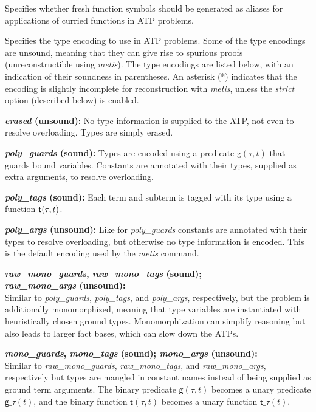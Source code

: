 \documentclass[a4paper,12pt]{article}
\newcommand\const[1]{\textsf{#1}}
\begin{document}
\begin{enum}
Specifies whether fresh function symbols should be generated as aliases for
applications of curried functions in ATP problems.

Specifies the type encoding to use in ATP problems. Some of the type encodings
are unsound, meaning that they can give rise to spurious proofs
(unreconstructible using \textit{metis}). The type encodings are
listed below, with an indication of their soundness in parentheses.
An asterisk (*) indicates that the encoding is slightly incomplete for
reconstruction with \textit{metis}, unless the \emph{strict} option (described
below) is enabled.

\begin{enum}
\item[\labelitemi] \textbf{\textit{erased} (unsound):} No type information is
supplied to the ATP, not even to resolve overloading. Types are simply erased.

\item[\labelitemi] \textbf{\textit{poly\_guards} (sound):} Types are encoded using
a predicate \const{g}$(\tau, t)$ that guards bound
variables. Constants are annotated with their types, supplied as extra
arguments, to resolve overloading.

\item[\labelitemi] \textbf{\textit{poly\_tags} (sound):} Each term and subterm is
tagged with its type using a function $\const{t\/}(\tau, t)$.

\item[\labelitemi] \textbf{\textit{poly\_args} (unsound):}
Like for \textit{poly\_guards} constants are annotated with their types to
resolve overloading, but otherwise no type information is encoded. This
is the default encoding used by the \textit{metis} command.

\item[\labelitemi]
\textbf{%
\textit{raw\_mono\_guards}, \textit{raw\_mono\_tags} (sound); \\
\textit{raw\_mono\_args} (unsound):} \\
Similar to \textit{poly\_guards}, \textit{poly\_tags}, and \textit{poly\_args},
respectively, but the problem is additionally monomorphized, meaning that type
variables are instantiated with heuristically chosen ground types.
Monomorphization can simplify reasoning but also leads to larger fact bases,
which can slow down the ATPs.

\item[\labelitemi]
\textbf{%
\textit{mono\_guards}, \textit{mono\_tags} (sound);
\textit{mono\_args} (unsound):} \\
Similar to
\textit{raw\_mono\_guards}, \textit{raw\_mono\_tags}, and
\textit{raw\_mono\_args}, respectively but types are mangled in constant names
instead of being supplied as ground term arguments. The binary predicate
$\const{g}(\tau, t)$ becomes a unary predicate
$\const{g\_}\tau(t)$, and the binary function
$\const{t}(\tau, t)$ becomes a unary function
$\const{t\_}\tau(t)$.


\end{enum}
\end{enum}
\end{document}
